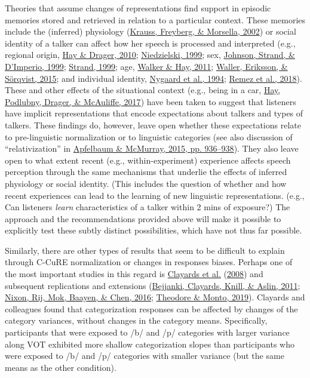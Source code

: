 \documentclass[
  11pt,
  english,
  man,floatsintext]{apa6}
\begin{document}
Theories that assume changes of representations find support in episodic memories stored and retrieved in relation to a particular context. These memories include the (inferred) physiology (\protect\hyperlink{ref-krauss2002}{Krauss, Freyberg, \& Morsella, 2002}) or social identity of a talker can affect how her speech is processed and interpreted (e.g., regional origin, \protect\hyperlink{ref-hay-drager2010}{Hay \& Drager, 2010}; \protect\hyperlink{ref-niedzielski1999}{Niedzielski, 1999}; sex, \protect\hyperlink{ref-johnson1999}{Johnson, Strand, \& D'Imperio, 1999}; \protect\hyperlink{ref-strand1999}{Strand, 1999}; age, \protect\hyperlink{ref-walker-hay2011}{Walker \& Hay, 2011}; \protect\hyperlink{ref-skoogwaller2015}{Waller, Eriksson, \& Sörqvist, 2015}; and individual identity, \protect\hyperlink{ref-nygaard1994}{Nygaard et al., 1994}; \protect\hyperlink{ref-remez2018}{Remez et al., 2018}). These and other effects of the situational context (e.g., being in a car, \protect\hyperlink{ref-hay2017}{Hay, Podlubny, Drager, \& McAuliffe, 2017}) have been taken to suggest that listeners have implicit representations that encode expectations about talkers and types of talkers. These findings do, however, leave open whether these expectations relate to pre-linguistic normalization or to linguistic categories (see also discussion of {``relativization''} in \protect\hyperlink{ref-apfelbaum-mcmurray2015}{Apfelbaum \& McMurray, 2015, pp. 936--938}). They also leave open to what extent recent (e.g., within-experiment) experience affects speech perception through the same mechanisms that underlie the effects of inferred physiology or social identity. (This includes the question of whether and how recent experiences can lead to the learning of new linguistic representations. (e.g., Can listeners \emph{learn} characteristics of a talker within 2 mins of exposure?) The approach and the recommendations provided above will make it possible to explicitly test these subtly distinct possibilities, which have not thus far possible.

Similarly, there are other types of results that seem to be difficult to explain through C-CuRE normalization or changes in responses biases. Perhaps one of the most important studies in this regard is \protect\hyperlink{ref-clayards2008}{Clayards et al.} (\protect\hyperlink{ref-clayards2008}{2008}) and subsequent replications and extensions (\protect\hyperlink{ref-bejjanki2011}{Bejjanki, Clayards, Knill, \& Aslin, 2011}; \protect\hyperlink{ref-nixon2016}{Nixon, Rij, Mok, Baayen, \& Chen, 2016}; \protect\hyperlink{ref-theodore-monto2019}{Theodore \& Monto, 2019}). Clayards and colleagues found that categorization responses can be affected by changes of the category variances, without changes in the category means. Specifically, participants that were exposed to /b/ and /p/ categories with larger variance along VOT exhibited more shallow categorization slopes than participants who were exposed to /b/ and /p/ categories with smaller variance (but the same means as the other condition).
\end{document}
